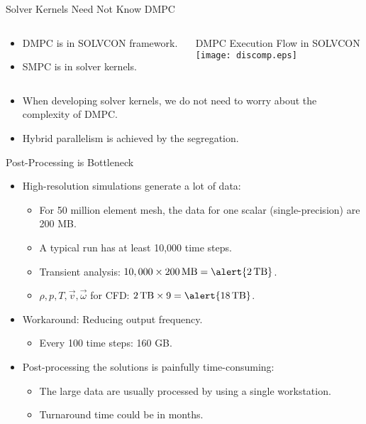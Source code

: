 \documentclass[dvips,xcolor=pst,14pt]{beamer}
\begin{document}
\begin{frame}{
%
Solver Kernels Need Not Know DMPC
%
}
\begin{columns}[c]
\begin{column}{.3\textwidth}
\begin{itemize}
  \item DMPC is in SOLVCON framework.
  \item SMPC is in solver kernels.
\end{itemize}
\end{column}
\begin{column}{.7\textwidth} \centering \footnotesize
  DMPC Execution Flow in SOLVCON \\
  \texttt{[image: discomp.eps]}
\end{column}
\end{columns}
\begin{itemize}
  \item When developing solver kernels, we do not need to worry about the
  complexity of DMPC.
  \item Hybrid parallelism is achieved by the segregation.
\end{itemize}
\end{frame}

\begin{frame}{
%
Post-Processing is Bottleneck
%
}
\begin{itemize}
  \item High-resolution simulations generate a lot of data:
  \begin{itemize}
    \item For 50 million element mesh, the data for one scalar
    (single-precision) are \alert{200 MB}.
    \item A typical run has at least 10,000 time steps.
    \item Transient analysis: $10,000 \times 200 \,\mbox{MB} = \alert{2
    \,\mbox{TB}}$.
    \item $\rho, p, T, \vec{v}, \vec{\omega}$ for CFD: $2 \,\mbox{TB} \times 9 =
    \alert{18 \,\mbox{TB}}$.
  \end{itemize}
  \item Workaround: Reducing output frequency.
  \begin{itemize}
    \item Every 100 time steps: \alert{160 GB}.
  \end{itemize}
  \item Post-processing the solutions is painfully time-consuming:
  \begin{itemize}
    \item The large data are usually processed by using a single workstation.
    \item Turnaround time could be in months.
  \end{itemize}
\end{itemize}
\end{frame}
\end{document}
